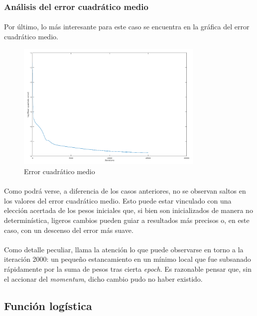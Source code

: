 \documentclass[12pt, twocolumn]{article}
\begin{document}
	\subsubsection{Análisis del error cuadrático medio}
	
	\paragraph{} Por último, lo más interesante para este caso se encuentra en la gráfica del error cuadrático medio. 
	
	\begin{figure}[H]
		\centering
		\includegraphics[width=9cm]{../results/batch_variable/1/log_batch.png}
		\caption{Error cuadrático medio}
		\label{error3}
	\end{figure}
	
	\paragraph{} Como podrá verse, a diferencia de los casos anteriores, no se observan saltos en los valores del error cuadrático medio. Esto puede estar vinculado con una elección acertada de los pesos iniciales que, si bien son inicializados de manera no determinística, ligeros cambios pueden guiar a resultados más precisos o, en este caso, con un descenso del error más suave. 
	
	\paragraph{} Como detalle peculiar, llama la atención lo que puede observarse en torno a la iteración 2000: un pequeño estancamiento en un mínimo local que fue subsanado rápidamente por la suma de pesos tras cierta \textit{epoch}. Es razonable pensar que, sin el accionar del \textit{momentum}, dicho cambio pudo no haber existido. 
	
	\subsection{Función logística}
	
\end{document}
